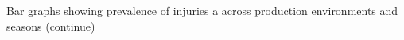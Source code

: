Bar graphs showing  prevalence of injuries a across production environments and seasons (continue)
\label{fig:barplot2}